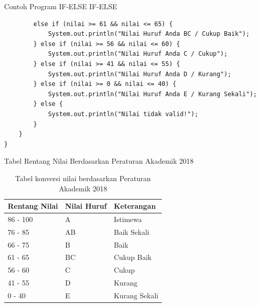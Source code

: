 \documentclass{beamer}
\begin{document}
\begin{frame}[fragile]{Contoh Program IF-ELSE IF-ELSE}
\begin{lstlisting}
        else if (nilai >= 61 && nilai <= 65) {
            System.out.println("Nilai Huruf Anda BC / Cukup Baik");
        } else if (nilai >= 56 && nilai <= 60) {
            System.out.println("Nilai Huruf Anda C / Cukup");
        } else if (nilai >= 41 && nilai <= 55) {
            System.out.println("Nilai Huruf Anda D / Kurang");
        } else if (nilai >= 0 && nilai <= 40) {
            System.out.println("Nilai Huruf Anda E / Kurang Sekali");
        } else {
            System.out.println("Nilai tidak valid!");
        }
    }
}
\end{lstlisting}
\end{frame}

\begin{frame}{Tabel Rentang Nilai Berdasarkan Peraturan Akademik 2018}
  \begin{table}
    \footnotesize
    \begin{tabular}{p{}|p{}|p{}}
    \textbf{Rentang Nilai} & \textbf{Nilai Huruf} & \textbf{Keterangan} \\
    \hline
    \rowcolor{lightgray}
    86 - 100 & A & Istimewa \\
    \rowcolor{white}
    76 - 85 & AB & Baik Sekali \\
    \rowcolor{lightgray}
    66 - 75 & B & Baik \\
    \rowcolor{white}
    61 - 65 & BC & Cukup Baik \\
    \rowcolor{lightgray}
    56 - 60 & C & Cukup \\
    \rowcolor{white}
    41 - 55 & D & Kurang \\
    \rowcolor{lightgray}
    0 - 40 & E & Kurang Sekali \\
    \end{tabular}
    \caption{Tabel konversi nilai berdasarkan Peraturan Akademik 2018}
  \end{table}
\end{frame}
\end{document}

